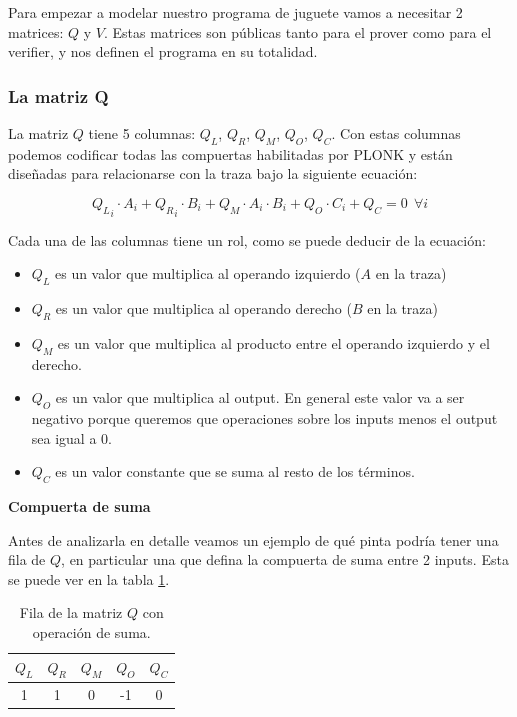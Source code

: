 Para empezar a modelar nuestro programa de juguete vamos a necesitar 2 matrices: $Q$ y $V$. Estas matrices son públicas tanto para el prover como para el verifier, y nos definen el programa en su totalidad.

\subsubsection{\textbf{La matriz Q}}

La matriz $Q$ tiene 5 columnas: $Q_L$, $Q_R$, $Q_M$, $Q_O$, $Q_C$. Con estas columnas podemos codificar todas las compuertas habilitadas por PLONK y están diseñadas para relacionarse con la traza bajo la siguiente ecuación:

\newcommand{\PlonkFormula}{
$${Q_L}_i \cdot A_i + {Q_R}_i \cdot B_i + Q_M\cdot A_i\cdot B_i + Q_O\cdot C_i + Q_C = 0 ~~ \forall i$$
}

\PlonkFormula

Cada una de las columnas tiene un rol, como se puede deducir de la ecuación:
\begin{itemize}
    \item $Q_L$ es un valor que multiplica al operando izquierdo ($A$ en la traza)
    \item $Q_R$ es un valor que multiplica al operando derecho ($B$ en la traza)
    \item $Q_M$ es un valor que multiplica al producto entre el operando izquierdo y el derecho.
    \item $Q_O$ es un valor que multiplica al output. En general este valor va a ser negativo porque queremos que operaciones sobre los inputs menos el output sea igual a $0$.
    \item $Q_C$ es un valor constante que se suma al resto de los términos.
\end{itemize}

\textbf{Compuerta de suma}

Antes de analizarla en detalle veamos un ejemplo de qué pinta podría tener una fila de $Q$, en particular una que defina la compuerta de suma entre 2 inputs. Esta se puede ver en la tabla \ref{tab:q_suma}.

\begin{table}[h!]
\begin{center}
\begin{tabular}{ccccc}
\toprule
\textbf{$Q_L$} & \textbf{$Q_R$} & \textbf{$Q_M$} & \textbf{$Q_O$} & \textbf{$Q_C$} \\
\midrule
1 & 1 & 0 & -1 & 0 \\
\bottomrule
\end{tabular}
\caption{Fila de la matriz $Q$ con operación de suma.}
\label{tab:q_suma}
\end{center}
\end{table}

